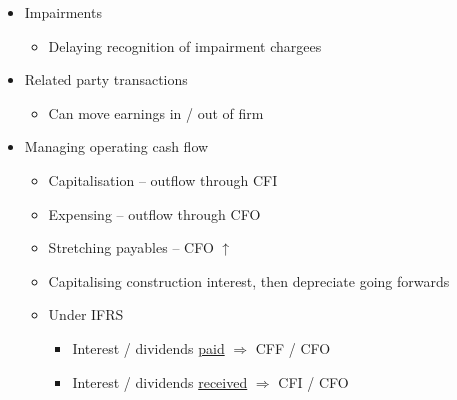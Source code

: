 \documentclass[../notes_compiled.tex]{subfiles}
\begin{document}
\begin{itemize}
\item Impairments
\begin{itemize}
\item Delaying recognition of impairment chargees
\end{itemize}

\item Related party transactions
\begin{itemize}
\item Can move earnings in / out of firm
\end{itemize}

\item Managing operating cash flow
\begin{itemize}
\item Capitalisation -- outflow through CFI
\item Expensing -- outflow through CFO
\item Stretching payables -- CFO $\uparrow$
\item Capitalising construction interest, then depreciate going forwards
\item Under IFRS
\begin{itemize}
\item Interest / dividends \underline{paid} $\Rightarrow$ CFF / CFO
\item Interest / dividends \underline{received} $\Rightarrow$ CFI / CFO
\end{itemize}
\end{itemize}
\end{itemize}
\end{document}
